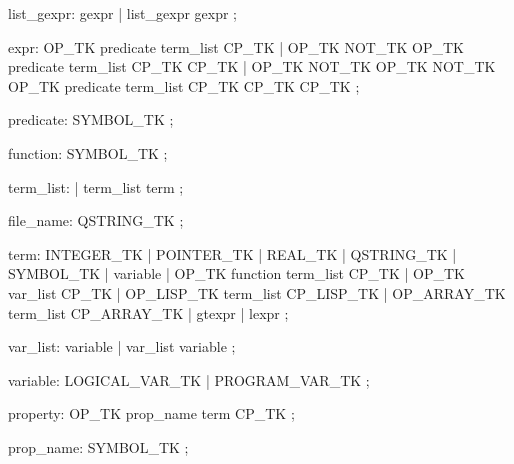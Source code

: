 list_gexpr:
        gexpr
        | list_gexpr gexpr
        ;

expr:
        OP_TK predicate term_list CP_TK
        |  OP_TK NOT_TK OP_TK predicate
                term_list CP_TK CP_TK
        |  OP_TK NOT_TK OP_TK NOT_TK OP_TK
                predicate term_list CP_TK CP_TK CP_TK
        ;

predicate:
        SYMBOL_TK
        ;

function:
        SYMBOL_TK
        ;

term_list:
        | term_list term
        ;

file_name: QSTRING_TK
        ;

term:
        INTEGER_TK
        | POINTER_TK
        | REAL_TK
        | QSTRING_TK
        | SYMBOL_TK
        | variable
        | OP_TK function term_list CP_TK
        | OP_TK var_list CP_TK
        | OP_LISP_TK term_list CP_LISP_TK
        | OP_ARRAY_TK term_list CP_ARRAY_TK
        | gtexpr
        | lexpr
        ;

var_list:
        variable
        | var_list variable
        ;

variable:
        LOGICAL_VAR_TK
        | PROGRAM_VAR_TK
        ;

property:
        OP_TK prop_name term CP_TK
        ;

prop_name:
        SYMBOL_TK
        ;
